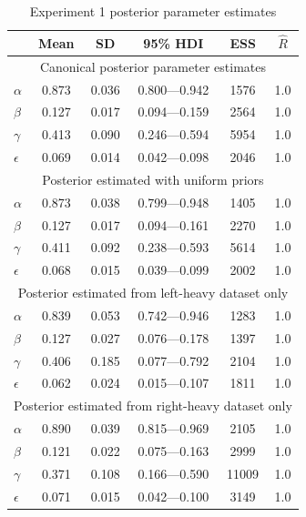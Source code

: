 \documentclass[doc,biblatex,floatsintext]{apa7}
\begin{document}
\clearpage

\begin{table}
\begin{center}
\begin{threeparttable}
\caption{Experiment 1 posterior parameter estimates}
\footnotesize
\begin{tabular}{lccccc}
\toprule
{} &   Mean &     SD &  95\% HDI &  ESS &  $\hat{R}$ \\
\midrule
\multicolumn{6}{c}{Canonical posterior parameter estimates} \\
\midrule
$\alpha$ &  0.873 &  0.036 &     0.800---0.942 &    1576 &    1.0 \\
$\beta$ &  0.127 &  0.017 &     0.094---0.159 &    2564 &    1.0 \\
$\gamma$ &  0.413 &  0.090 &     0.246---0.594 &    5954 &    1.0 \\
$\epsilon$ &  0.069 &  0.014 &     0.042---0.098 &    2046 &    1.0 \\
\midrule
\multicolumn{6}{c}{Posterior estimated with uniform priors} \\
\midrule
$\alpha$ &  0.873 &  0.038 &     0.799---0.948 &    1405 &    1.0 \\
$\beta$ &  0.127 &  0.017 &     0.094---0.161 &    2270 &    1.0 \\
$\gamma$ &  0.411 &  0.092 &     0.238---0.593 &    5614 &    1.0 \\
$\epsilon$ &  0.068 &  0.015 &     0.039---0.099 &    2002 &    1.0 \\
\midrule
\multicolumn{6}{c}{Posterior estimated from left-heavy dataset only} \\
\midrule
$\alpha$ &  0.839 &  0.053 &     0.742---0.946 &    1283 &    1.0 \\
$\beta$ &  0.127 &  0.027 &     0.076---0.178 &    1397 &    1.0 \\
$\gamma$ &  0.406 &  0.185 &     0.077---0.792 &    2104 &    1.0 \\
$\epsilon$ &  0.062 &  0.024 &     0.015---0.107 &    1811 &    1.0 \\
\midrule
\multicolumn{6}{c}{Posterior estimated from right-heavy dataset only} \\
\midrule
$\alpha$ &  0.890 &  0.039 &     0.815---0.969 &    2105 &    1.0 \\
$\beta$ &  0.121 &  0.022 &     0.075---0.163 &    2999 &    1.0 \\
$\gamma$ &  0.371 &  0.108 &     0.166---0.590 &   11009 &    1.0 \\
$\epsilon$ &  0.071 &  0.015 &     0.042---0.100 &    3149 &    1.0 \\
\bottomrule
\end{tabular}
\label{supptable1}
\end{threeparttable}
\end{center}
\end{table}
\end{document}
